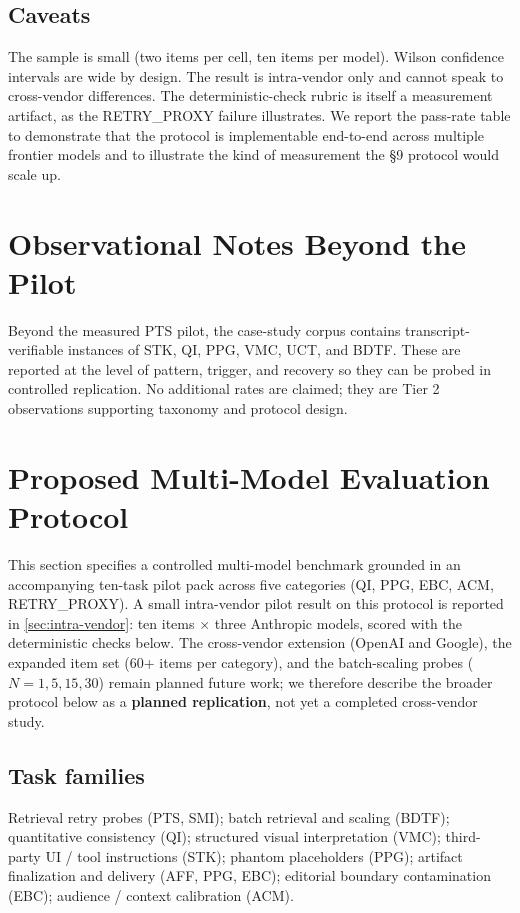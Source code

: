\documentclass[11pt]{article}
\begin{document}
\subsection{Caveats}
The sample is small (two items per cell, ten items per model). Wilson confidence intervals are wide by design. The result is intra-vendor only and cannot speak to cross-vendor differences. The deterministic-check rubric is itself a measurement artifact, as the RETRY\_PROXY failure illustrates. We report the pass-rate table to demonstrate that the protocol is implementable end-to-end across multiple frontier models and to illustrate the kind of measurement the §9 protocol would scale up.


\section{Observational Notes Beyond the Pilot}
Beyond the measured PTS pilot, the case-study corpus contains transcript-verifiable instances of STK, QI, PPG, VMC, UCT, and BDTF. These are reported at the level of pattern, trigger, and recovery so they can be probed in controlled replication. No additional rates are claimed; they are Tier 2 observations supporting taxonomy and protocol design.

\section{Proposed Multi-Model Evaluation Protocol}
\label{sec:protocol}

This section specifies a controlled multi-model benchmark grounded in an accompanying ten-task pilot pack across five categories (QI, PPG, EBC, ACM, RETRY\_PROXY). A small intra-vendor pilot result on this protocol is reported in \cref{sec:intra-vendor}: ten items \(\times\) three Anthropic models, scored with the deterministic checks below. The cross-vendor extension (OpenAI and Google), the expanded item set (60+ items per category), and the batch-scaling probes ($N = 1, 5, 15, 30$) remain planned future work; we therefore describe the broader protocol below as a \textbf{planned replication}, not yet a completed cross-vendor study.

\subsection{Task families}
Retrieval retry probes (PTS, SMI); batch retrieval and scaling (BDTF); quantitative consistency (QI); structured visual interpretation (VMC); third-party UI / tool instructions (STK); phantom placeholders (PPG); artifact finalization and delivery (AFF, PPG, EBC); editorial boundary contamination (EBC); audience / context calibration (ACM).
\end{document}
